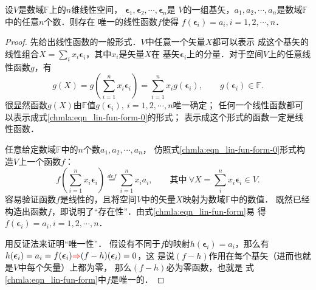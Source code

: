
\begin{theorem} \label{chmla:thm_lin-fun-basic}
    设$V$是数域$\mathbb{F}$上的$n$维线性空间，
    $\boldsymbol{\epsilon}_1,\boldsymbol{\epsilon}_2,\cdots,\boldsymbol{\epsilon}_n$是
    $V$的一组基矢，$a_1,a_2,\cdots,a_n$是数域$\mathbb{F}$中的任意$n$个数．则存在
    唯一的线性函数$f$使得
    $f\left(  \boldsymbol{\epsilon}_i\right) = a_i,i=1,2,\cdots,n$．
\end{theorem}
\begin{proof}
    先给出线性函数的一般形式．$V$中任意一个矢量$X$都可以表示
    成这个基矢的线性组合$X= \sum_{i}x_i \boldsymbol{\epsilon}_i $，其中$x_i$是矢量$X$在
    基矢$\boldsymbol{\epsilon}_i$上的分量．对于空间$V$上的任意线性函数$g$，有
    \begin{equation}\label{chmla:eqn_lin-fun-form-0}
        g(X)= g\left( \sum_{i=1}^{n} x_i \boldsymbol{\epsilon}_i\right)
        = \sum_{i=1}^{n} x_i g\left(  \boldsymbol{\epsilon}_i\right) ,
        \qquad g(\boldsymbol{\epsilon}_i ) \in \mathbb{F}.
    \end{equation}
    很显然函数$g(X)$由$\mathbb{F}$值$g(\boldsymbol{\epsilon}_i), \ i =1,2,\cdots,n$唯一确定；
    任何一个线性函数都可以表示成式\eqref{chmla:eqn_lin-fun-form-0}的形式；
    表示成这个形式的函数一定是线性函数．

    任意给定数域$\mathbb{F}$中的$n$个数$a_1,a_2,\cdots,a_n$，
    仿照式\eqref{chmla:eqn_lin-fun-form-0}形式构造$V$上一个函数$f$：
    \begin{equation}\label{chmla:eqn_lin-fun-form}
        f\left( \sum_{i=1}^{n} x_i \boldsymbol{\epsilon}_i\right)
        \overset{def}{=} \sum_{i=1}^{n}x_i a_i , \qquad
        {\text {其中}}\     \forall X = \sum_{i}^n x_i \boldsymbol{\epsilon}_i \in V.
    \end{equation}
    容易验证函数$f$是线性的，且将空间$V$中的矢量$X$映射为数域$\mathbb{F}$中的数值．
    既然已经构造出函数$f$，即说明了“存在性”．由式\eqref{chmla:eqn_lin-fun-form}易
    得$f\left(  \boldsymbol{\epsilon}_i\right) = a_i,i=1,2,\cdots,n$．

    用反证法来证明“唯一性”．
    假设有不同于$f$的映射$h(\boldsymbol{\epsilon}_i)=a_i$，那么有
    $h(\boldsymbol{\epsilon}_i)=a_i=f(\boldsymbol{\epsilon}_i)
    {\color{red}\Rightarrow} (f-h)(\boldsymbol{\epsilon}_i)=0$，这
    是说$(f-h)$作用在每个基矢（进而也就是$V$中每个矢量）上都为零，
    那么$(f-h)$必为零函数，也就是
    式\eqref{chmla:eqn_lin-fun-form}中$f$是唯一的．
\end{proof}

